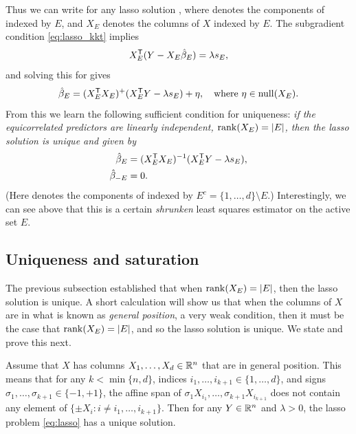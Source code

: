 \documentclass{article}
\begin{document}
Thus we can write  for any lasso solution
\smash{$\hbeta$}, where  denotes the components of
\smash{$\hbeta$} indexed by $E$, and $X_E$ denotes the columns of $X$ indexed by
$E$. The subgradient condition \eqref{eq:lasso_kkt} implies
\[
X_E^{\mathsf{T}} (Y - X_E \hat{\beta}_E) = \lambda s_E,
\]
and solving this for  gives  
\[
\hat{\beta}_E = (X_E^{\mathsf{T}} X_E)^+ (X_E^{\mathsf{T}} Y - \lambda s_E) + \eta, 
\quad \text{where $\eta \in \mathrm{null}(X_E)$}.
\]
From this we learn the following sufficient condition for uniqueness: \emph{if
  the equicorrelated predictors are linearly independent, $\mathrm{rank}(X_E) = |E|$,
  then the lasso solution is unique and given by}
\begin{equation}
\label{eq:lasso_unique}
\begin{aligned}
\hat{\beta}_E &= (X_E^{\mathsf{T}} X_E)^{-1} (X_E^{\mathsf{T}} Y - \lambda s_E), \\
\hat{\beta}_{-E} &= 0.
\end{aligned}
\end{equation}
(Here  denotes the components of \smash{$\hbeta$} indexed 
by $E^c = \{1,\dots,d\} \setminus E$.) Interestingly, we can see above that this
is a certain \emph{shrunken} least squares estimator on the active set $E$.    
 
\subsection{Uniqueness and saturation}

The previous subsection established that when $\mathrm{rank}(X_E) = |E|$, then the lasso
solution is unique. A short calculation will show us that when the columns of 
$X$ are in what is known as \emph{general position}, a very weak condition, then
it must be the case that $\mathrm{rank}(X_E) = |E|$, and so the lasso solution is
unique. We state and prove this next.    

\begin{proposition}
Assume that $X$ has columns $X_1,\dots,X_d \in \mathbb{R}^n$ that are in general
position. This means that for any $k < \min\{n,d\}$, indices $i_1,\dots,i_{k+1} 
\in \{1,\dots,d\}$, and signs $\sigma_1,\dots,\sigma_{k+1} \in \{-1,+1\}$, the 
affine span of $\sigma_1 X_{i_1}, \dots,\sigma_{k+1} X_{i_{k+1}}$ does not
contain any element of $\{\pm X_i : i \not= i_1,\dots,i_{k+1}\}$. Then for any
$Y \in \mathbb{R}^n$ and $\lambda>0$, the lasso problem \eqref{eq:lasso} has a unique
solution. 
\end{proposition}
\end{document}

